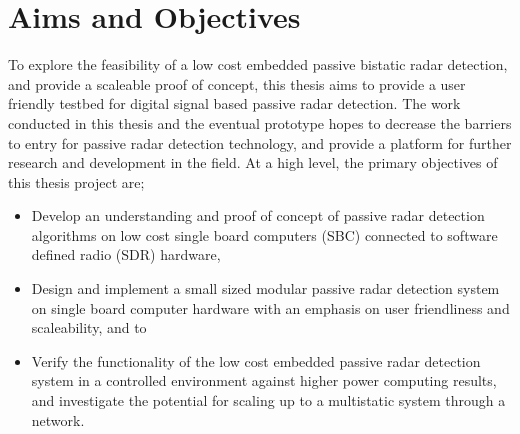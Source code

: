 

\section{Aims and Objectives}
To explore the feasibility of a low cost embedded passive bistatic radar detection, and provide a scaleable proof of concept, this thesis aims to provide a user friendly testbed for digital signal based passive radar detection. The work conducted in this thesis and the eventual prototype hopes to decrease the barriers to entry for passive radar detection technology, and provide a platform for further research and development in the field. At a high level, the primary objectives of this thesis project are;
\begin{itemize}
    \item Develop an understanding and proof of concept of passive radar detection algorithms on low cost single board computers (SBC) connected to software defined radio (SDR) hardware,
    \item Design and implement a small sized modular passive radar detection system on single board computer hardware with an emphasis on user friendliness and scaleability, and to
    \item Verify the functionality of the low cost embedded passive radar detection system in a controlled environment against higher power computing results, and investigate the potential for scaling up to a multistatic system through a network.
\end{itemize}

